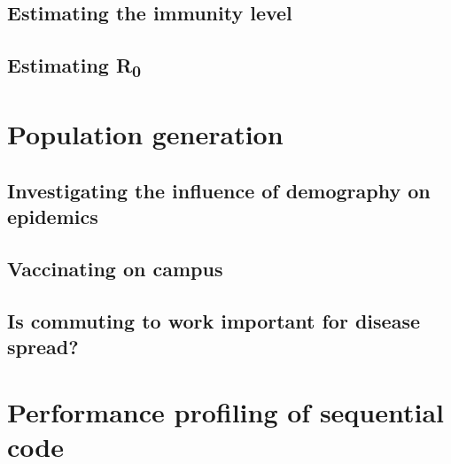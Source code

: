 \documentclass[runningheads]{llncs}
\begin{document}
\subsection{Estimating the immunity level}
\subsection{Estimating R\textsubscript{0}}

\section{Population generation}
\subsection{Investigating the influence of demography on epidemics}
\subsection{Vaccinating on campus}
\subsection{Is commuting to work important for disease spread?}

\section{Performance profiling of sequential code}
\end{document}
